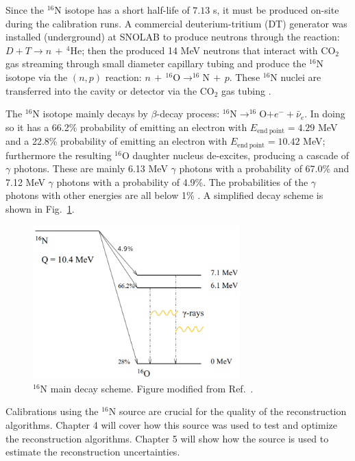 Since the $^{16}$N isotope has a short half-life of $7.13$ s, it must be produced on-site during the calibration runs. A commercial deuterium-tritium (DT) generator was installed (underground) at SNOLAB to produce neutrons through the reaction: $D+T\to n \, + \, ^{4}$He; then the produced 14 MeV neutrons that interact with CO$_2$ gas streaming through small diameter capillary tubing and produce the $^{16}$N isotope via the $(n,p)$ reaction: $n \, + \, ^{16}\mathrm{O} \to ^{16}\mathrm{N} \, + \,p$. These $^{16}$N nuclei are transferred into the cavity or detector via the CO$_2$ gas tubing \cite{dragowsky200216n}.

The $^{16}$N isotope mainly decays by $\beta$-decay process: $^{16}$N$\to ^{16}$O$+e^-+\bar{\nu}_e$. In doing so it has a 66.2\% probability of emitting an electron with $E_{\mathrm{end~point}}=4.29$ MeV and a 22.8\% probability of emitting an electron with $E_{\mathrm{end~point}}=10.42$ MeV; furthermore the resulting $^{16}$O daughter nucleus de-excites, producing a cascade of $\gamma$ photons. These are mainly 6.13 MeV $\gamma$ photons with a probability of 67.0\% and 7.12 MeV $\gamma$ photons with a probability of 4.9\%. The probabilities of the $\gamma$ photons with other energies are all below 1\% \cite{nndc}. A simplified decay scheme is shown in Fig.~\ref{n16decay}.

\begin{figure}[!htb]
	\centering
	\includegraphics[width=8cm]{n16_decay.png}
	\caption[$^{16}$N main decay scheme.]{$^{16}$N main decay scheme. Figure modified from Ref.~\cite{dragowsky200216n}.}
	\label{n16decay}
\end{figure}

Calibrations using the $^{16}$N source are crucial for the quality of the reconstruction algorithms. Chapter 4 will cover how this source was used to test and optimize the reconstruction algorithms. Chapter 5 will show how the source is used to estimate the reconstruction uncertainties.

